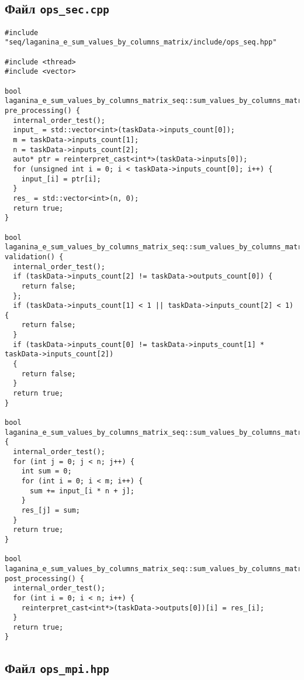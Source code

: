 \documentclass[12pt]{article}
\begin{document}
\subsection*{Файл \texttt{ops\_sec.cpp}}
\begin{verbatim}
#include "seq/laganina_e_sum_values_by_columns_matrix/include/ops_seq.hpp"

#include <thread>
#include <vector>

bool laganina_e_sum_values_by_columns_matrix_seq::sum_values_by_columns_matrix_Seq::
pre_processing() {
  internal_order_test();
  input_ = std::vector<int>(taskData->inputs_count[0]);
  m = taskData->inputs_count[1];
  n = taskData->inputs_count[2];
  auto* ptr = reinterpret_cast<int*>(taskData->inputs[0]);
  for (unsigned int i = 0; i < taskData->inputs_count[0]; i++) {
    input_[i] = ptr[i];
  }
  res_ = std::vector<int>(n, 0);
  return true;
}

bool laganina_e_sum_values_by_columns_matrix_seq::sum_values_by_columns_matrix_Seq::
validation() {
  internal_order_test();
  if (taskData->inputs_count[2] != taskData->outputs_count[0]) {
    return false;
  };
  if (taskData->inputs_count[1] < 1 || taskData->inputs_count[2] < 1) {
    return false;
  }
  if (taskData->inputs_count[0] != taskData->inputs_count[1] * taskData->inputs_count[2]) 
  {
    return false;
  }
  return true;
}

bool laganina_e_sum_values_by_columns_matrix_seq::sum_values_by_columns_matrix_Seq::run() 
{
  internal_order_test();
  for (int j = 0; j < n; j++) {
    int sum = 0;
    for (int i = 0; i < m; i++) {
      sum += input_[i * n + j];
    }
    res_[j] = sum;
  }
  return true;
}

bool laganina_e_sum_values_by_columns_matrix_seq::sum_values_by_columns_matrix_Seq::
post_processing() {
  internal_order_test();
  for (int i = 0; i < n; i++) {
    reinterpret_cast<int*>(taskData->outputs[0])[i] = res_[i];
  }
  return true;
}

\end{verbatim}
\subsection*{Файл \texttt{ops\_mpi.hpp}}
\end{document}
